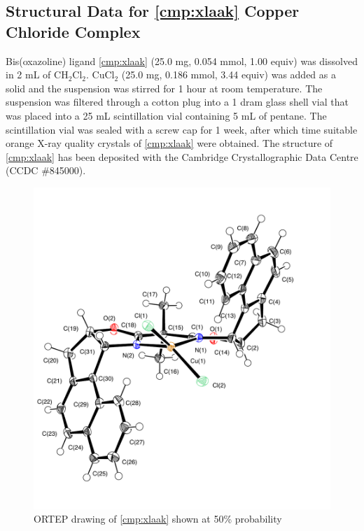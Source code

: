\subsection{Structural Data for  \ref{cmp:xlaak} Copper Chloride Complex}
Bis(oxazoline) ligand \ref{cmp:xlaak} (25.0 mg, 0.054 mmol, 1.00
equiv) was dissolved in 2 mL of CH$_2$Cl$_2$. CuCl$_2$ (25.0 mg, 0.186 mmol,
3.44 equiv) was added as a solid and the suspension was stirred for 1 hour at room temperature. The suspension was filtered through a cotton plug into
a 1 dram glass shell vial that was placed into a 25 mL scintillation vial
containing 5 mL of pentane. The scintillation vial was sealed with a screw cap for 1 week,
after which time suitable orange X-ray quality crystals of
\ref{cmp:xlaak} were obtained. The structure of \ref{cmp:xlaak} has been
deposited with the Cambridge Crystallographic Data Centre (CCDC \#845000).
\vspace{-45pt}
\begin{figure}[h]
  \centering
  \includegraphics[width=5.0in]{chp_asymmetric/images/xray/boxcomplex_labelled}
  \caption{ORTEP drawing of \ref{cmp:xlaak} shown at 50\% probability }
\end{figure}
\pagebreak
